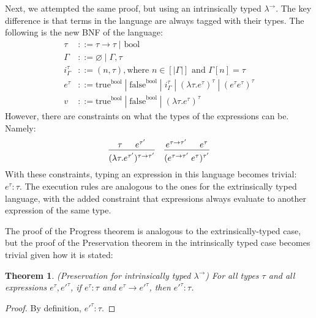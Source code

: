 \documentclass[12pt, letterpaper]{article}
\newtheorem{theorem}{Theorem}
\begin{document}
\begin{flushleft}
Next, we attempted the same proof, but using an intrinsically typed $\lambda^{\to}$. The key difference is that terms in the language are always tagged with their types. The following is the new BNF of the language:
\begin{align*}
\tau &::= \tau \to \tau\;|\text{ bool}\\
\Gamma &::= \varnothing\;|\;\Gamma, \tau\;\\
i^{\tau}_{\Gamma} &::= (n , \tau), \text{where } n \in [|\Gamma|] \text{ and } \Gamma[n] = \tau\\
e^{\tau} &::= \text{true}^{\text{bool}}\;|\;\text{false}^{\text{bool}}\;|\;i^{\tau}_{\Gamma}\;|\;(\lambda \tau.e^{\tau})^{\tau}\;|\;(e^{\tau} e^{\tau})^{\tau}\\
v &::= \text{true}^{\text{bool}}\;|\;\text{false}^{\text{bool}}\;|\;(\lambda \tau.e^{\tau})^{\tau}
\end{align*}
However, there are constraints on what the types of the expressions can be. Namely:
\[
\begin{prooftree}
\hypo{\tau}
\hypo{e^{\tau'}}
\infer2[]{(\lambda \tau . e^{\tau'})^{\tau \to \tau'}}
\end{prooftree}
\;\;\;\;
\begin{prooftree}
\hypo{e^{\tau \to \tau'}}
\hypo{e^{\tau}}
\infer2[]{(e^{\tau \to \tau'}\;e^{\tau})^{\tau'}}
\end{prooftree}
\]
With these constraints, typing an expression in this language becomes trivial: $e^{\tau} : \tau$. The execution rules are analogous to the ones for the extrinsically typed language, with the added constraint that expressions always evaluate to another expression of the same type. 

The proof of the Progress theorem is analogous to the extrinsically-typed case, but the proof of the Preservation theorem in the intrinsically typed case becomes trivial given how it is stated:

\begin{theorem}
(Preservation for intrinsically typed $\lambda^{\to}$) For all types $\tau$ and all expressions $e^{\tau}, e'^{\tau}$, if $e^{\tau} : \tau$ and $e^{\tau} \longrightarrow e'^{\tau}$, then $e'^{\tau} : \tau$.
\end{theorem}
\begin{proof}
By definition, $e'^{\tau} : \tau$.
\end{proof}
\end{flushleft}
\end{document}
